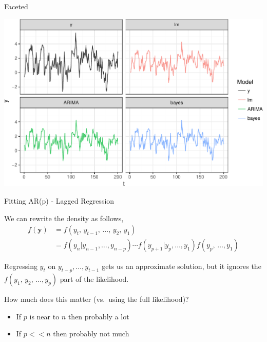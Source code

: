 \documentclass[11pt,ignorenonframetext,]{beamer}
\begin{document}
\begin{frame}{%
\protect\hypertarget{faceted}{%
Faceted}}

\begin{center}\includegraphics[width=\textwidth]{Lec10_files/figure-beamer/unnamed-chunk-10-1} \end{center}

\end{frame}

\begin{frame}[t]{%
\protect\hypertarget{fitting-arp---lagged-regression}{%
Fitting AR(p) - Lagged Regression}}

We can rewrite the density as follows, \[
\begin{aligned}
f(\symbf y)
  &= f(y_t, \,y_{t-1}, \,\ldots, \,y_{2}, \,y_{1}) \\
  &= f(y_{n}|y_{n-1},\ldots,y_{n-p}) \cdots  f(y_{p+1}|y_p,\ldots,y_1)  f(y_p, \,\ldots, y_1)
\end{aligned}
\]

\pause

Regressing \(y_t\) on \(y_{t-p}, \ldots, y_{t-1}\) gets us an
approximate solution, but it ignores the
\(f(y_1, \, y_2, \,\ldots, y_p)\) part of the likelihood.

How much does this matter (vs.~using the full likelihood)?

\begin{itemize}
\item
  If \(p\) is near to \(n\) then probably a lot
\item
  If \(p << n\) then probably not much
\end{itemize}

\end{frame}
\end{document}
